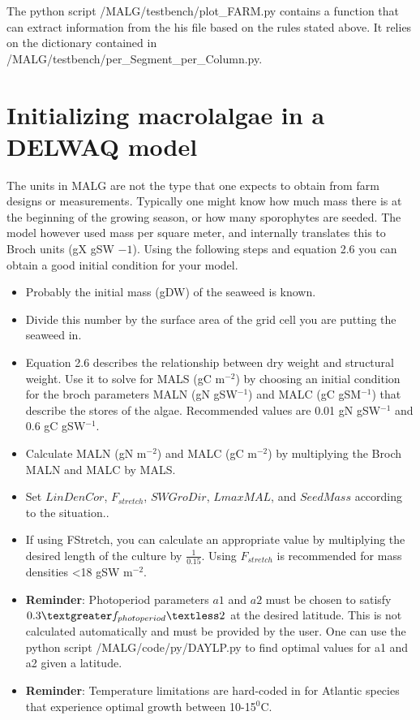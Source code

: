 \documentclass{deltares_manual}
\begin{document}
The python script /MALG/testbench/plot\_FARM.py contains a function that can extract information from the his file based on the rules stated above. It relies on the dictionary contained in /MALG/testbench/per\_Segment\_per\_Column.py.

\section{Initializing macrolalgae in a DELWAQ model}

The units in MALG are not the type that one expects to obtain from farm designs or measurements. Typically one might know how much mass there is at the beginning of the growing season, or how many sporophytes are seeded. The model however used mass per square meter, and internally translates this to Broch units (gX gSW ${-1}$). Using the following steps and equation 2.6 you can obtain a good initial condition for your model.\\
\begin{itemize}
	\item Probably the initial mass (gDW) of the seaweed is known.
	\item Divide this number by the surface area of the grid cell you are putting the seaweed in.
	\item Equation 2.6 describes the relationship between dry weight and structural weight. Use it to solve for MALS (gC m$^{-2}$) by choosing an initial condition for the broch parameters MALN (gN gSW$^{-1}$) and MALC (gC gSM$^{-1}$) that describe the stores of the algae. Recommended values are 0.01 gN gSW$^{-1}$ and 0.6 gC gSW$^{-1}$.
	\item Calculate MALN (gN m$^{-2}$) and MALC (gC m$^{-2}$) by multiplying the Broch MALN and MALC by MALS.
	\item Set $LinDenCor$, $F_{stretch}$, $SWGroDir$, $LmaxMAL$, and $SeedMass$ according to the situation.. 
	\item If using FStretch, you can calculate an appropriate value by multiplying the desired length of the culture by $\frac{1}{0.15}$. Using $F_{stretch}$ is recommended for mass densities \textless 18 gSW m$^{-2}$. 
	\item \textbf{Reminder}: Photoperiod parameters $a1$ and $a2$ must be chosen to satisfy $0.3 \textgreater f_{photoperiod} \textless 2$ at the desired latitude. This is not calculated automatically and must be provided by the user. One can use the python script /MALG/code/py/DAYLP.py to find optimal values for a1 and a2 given a latitude.
	\item \textbf{Reminder}: Temperature limitations are hard-coded in for Atlantic species that experience optimal growth between 10-15$^0$C.
\end{itemize}
\end{document}
